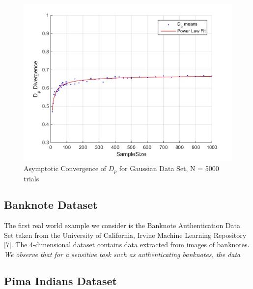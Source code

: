 \documentclass{article}
\begin{document}
		\begin{figure}[h!]
			\caption{Asymptotic Convergence of $D_p$ for Gaussian Data Set, N = 5000 trials}
			\centering
			\includegraphics[scale=0.6]{dp_n50_gaussian}
		\end{figure}	
		\newpage
		\subsection*{\small Banknote Dataset}
		The first real world example we consider is the Banknote Authentication Data Set taken from the University of California, Irvine Machine Learning Repository [7]. The 4-dimensional dataset contains data extracted from images of banknotes. \emph{We observe that for a sensitive task such as authenticating banknotes, the data}
		
		\subsection*{\small Pima Indians Dataset}
		
\end{document}
